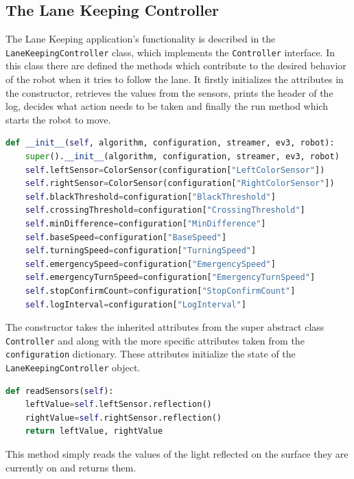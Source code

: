 \subsection{The Lane Keeping Controller}
\label{sec:lk-controller}

The Lane Keeping application’s functionality is described in the \texttt{LaneKeepingController} class, which implements the \texttt{Controller} interface. In this class there are defined the methods which contribute to the desired behavior of the robot when it tries to follow the lane. It firstly initializes the attributes in the constructor, retrieves the values from the sensors, prints the header of the log, decides what action needs to be taken and finally the run method which starts the robot to move.

\begin{lstlisting}[language=Python, caption={LaneKeepingController constructor.}, label={lst:lk-init}]
def __init__(self, algorithm, configuration, streamer, ev3, robot):
    super().__init__(algorithm, configuration, streamer, ev3, robot)
    self.leftSensor=ColorSensor(configuration["LeftColorSensor"])
    self.rightSensor=ColorSensor(configuration["RightColorSensor"])
    self.blackThreshold=configuration["BlackThreshold"]
    self.crossingThreshold=configuration["CrossingThreshold"]
    self.minDifference=configuration["MinDifference"]
    self.baseSpeed=configuration["BaseSpeed"]
    self.turningSpeed=configuration["TurningSpeed"]
    self.emergencySpeed=configuration["EmergencySpeed"]
    self.emergencyTurnSpeed=configuration["EmergencyTurnSpeed"]
    self.stopConfirmCount=configuration["StopConfirmCount"]
    self.logInterval=configuration["LogInterval"]
\end{lstlisting}

The constructor takes the inherited attributes from the super abstract class \texttt{Controller} and along with the more specific attributes taken from the \texttt{configuration} dictionary. These attributes initialize the state of the \texttt{LaneKeepingController} object.

\begin{lstlisting}[language=Python, caption={LaneKeepingController sensors reading.}, label={lst:lk-init}]
def readSensors(self):
    leftValue=self.leftSensor.reflection()
    rightValue=self.rightSensor.reflection()
    return leftValue, rightValue
\end{lstlisting}

This method simply reads the values of the light reflected on the surface they are currently on and returns them.

